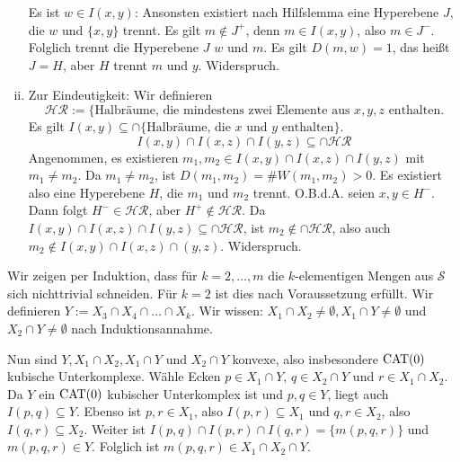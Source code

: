 \begin{beweis}
\begin{enumerate}[(i)]
\begin{minipage}{0.2\textwidth}
\begin{flushright}
			\end{flushright}
		\end{minipage}
		
		Es ist $w \in I(x,y)$:
		Ansonsten existiert nach Hilfslemma eine Hyperebene $J$, die $w$ und $\{x,y\}$ trennt.
		Es gilt $m \notin J^+$, denn $m \in I(x,y)$, also $m \in J^-$.
		Folglich trennt die Hyperebene $J$ $w$ und $m$.
		Es gilt $D(m,w) = 1$, das heißt $J = H$, aber $H$ trennt $m$ und $y$. Widerspruch.
		
		\item Zur Eindeutigkeit:
		Wir definieren
		\[
			\mathcal{HR} := \{\text{Halbräume, die mindestens zwei Elemente aus } x,y,z \text{ enthalten}.
		\]
		Es gilt $I(x,y) \subseteq \cap \{\text{Halbräume, die } x \text{ und } y \text{ enthalten}\}$.
		\[
			I(x,y) \cap I(x,z) \cap I(y,z) \subseteq \cap \mathcal{HR}
		\]
		Angenommen, es existieren $m_1,m_2 \in I(x,y) \cap I(x,z) \cap I(y,z)$ mit $m_1 \neq m_2$.
		Da $m_1 \neq m_2$, ist $D(m_1,m_2) = \#W(m_1,m_2) > 0$.
		Es existiert also eine Hyperebene $H$, die $m_1$ und $m_2$ trennt.
		O.B.d.A. seien $x,y \in H^-$.
		Dann folgt $H^- \in \mathcal{HR}$, aber $H^+ \notin \mathcal{HR}$.
		Da $I(x,y) \cap I(x,z) \cap I(y,z) \subseteq \cap \mathcal{HR}$, ist $m_2 \notin \cap \mathcal{HR}$, also auch $m_2 \notin I(x,y) \cap I(x,z) \cap(y,z)$.
		Widerspruch. \qedhere
	\end{enumerate}
\end{beweis}
\newpage
\begin{beweis}
	Wir zeigen per Induktion, dass für $k = 2, \dots, m$ die $k$-elementigen Mengen aus $\mathcal{S}$ sich nichttrivial schneiden.
	Für $k=2$ ist dies nach Voraussetzung erfüllt.
	Wir definieren $Y := X_3 \cap X_4 \cap \dots \cap X_k$.
	Wir wissen: $X_1 \cap  X_2 \neq \emptyset, X_1 \cap Y \neq \emptyset$ und $X_2 \cap Y \neq \emptyset$ nach Induktionsannahme.
	
	Nun sind $Y, X_1 \cap X_2, X_1 \cap Y$ und $X_2 \cap Y$ konvexe, also insbesondere $\operatorname{CAT(0)}$ kubische Unterkomplexe.
	Wähle Ecken $p \in X_1 \cap Y$, $q \in X_2 \cap Y$ und $r \in X_1 \cap X_2$.
	Da $Y$ ein $\operatorname{CAT(0)}$ kubischer Unterkomplex ist und $p,q \in Y$, liegt auch $I(p,q) \subseteq Y$.
	Ebenso ist $p,r \in X_1$, also $I(p,r) \subseteq X_1$ und $q,r \in X_2$, also $I(q,r) \subseteq X_2$.
	Weiter ist $I(p,q) \cap I(p,r) \cap I(q,r) = \{m(p,q,r)\}$ und $m(p,q,r) \in Y$.
	Folglich ist $m(p,q,r) \in X_1 \cap X_2 \cap Y$. \qedhere
\end{beweis}

